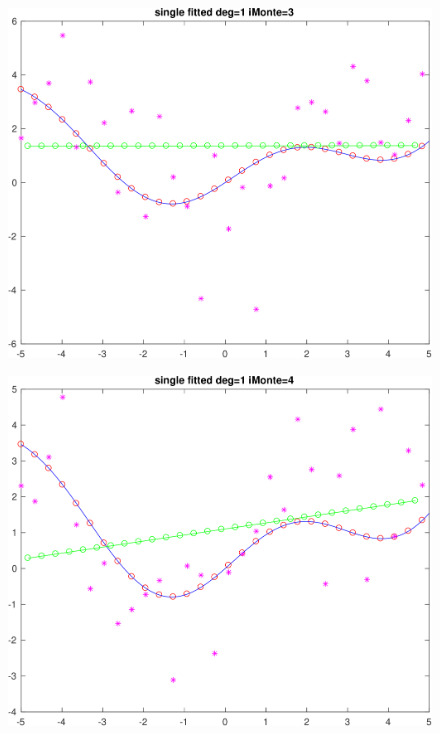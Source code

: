 \documentclass[11pt]{article}
\begin{document}
\begin{figure}[h!]
\centering\includegraphics[scale=0.1]{single_poly_d_1_iMonte_3.png}
\end{figure}

\begin{figure}[h!]
\centering\includegraphics[scale=0.1]{single_poly_d_1_iMonte_4.png}
\end{figure}
\end{document}
